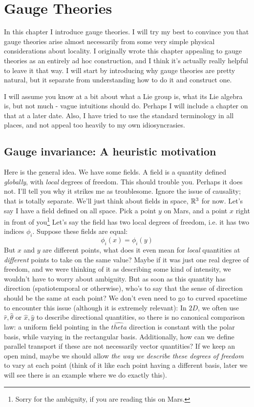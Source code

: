\documentclass[main.tex]{subfiles}
\begin{document}
\chapter{Gauge Theories}
In this chapter I introduce gauge theories. I will try my best to convince you that gauge theories arise almost necessarily from some very simple physical considerations about locality. I originally wrote this chapter appealing to gauge theories as an entirely ad hoc construction, and I think it's actually really helpful to leave it that way. I will start by introducing why gauge theories are pretty natural, but it separate from understanding how to do it and construct one.

I will assume you know at a bit about what a Lie group is, what its Lie algebra is, but not much - vague intuitions should do. Perhaps I will include a chapter on that at a later date. Also, I have tried to use the standard terminology in all places, and not appeal too heavily to my own idiosyncrasies.


\section{Gauge invariance: A heuristic motivation}

Here is the general idea. We have some fields. A field is a quantity defined \textit{globally}, with \textit{local} degrees of freedom. This should trouble you. Perhaps it does not. I'll tell you why it strikes me as troublesome. Ignore the issue of causality; that is totally separate. We'll just think about fields in space, $\mathbb{R}^3$ for now. Let's say I have a field defined on all space. Pick a point $y$ on Mars, and a point $x$ right in front of you\footnote{Sorry for the ambiguity, if you are reading this on Mars.} Let's say the field has two local degrees of freedom, i.e. it has two indices $\phi_i$. Suppose these fields are equal:
\[
\phi_i (x) = \phi_i (y)
\]
But $x$ and $y$ are different points, what does it even mean for \textit{local} quantities at \textit{different} points to take on the same value? Maybe if it was just one real degree of freedom, and we were thinking of it as describing some kind of intensity, we wouldn't have to worry about ambiguity. But as soon as this quantity has direction (spatiotemporal or otherwise), who's to say that the sense of direction should be the same at each point? We don't even need to go to curved spacetime to encounter this issue (although it is extremely relevant): In $2D$, we often use $\hat{r},\hat{\theta}$ or $\hat{x},\hat{y}$ to describe directional quantities, so there is no canonical comparison law: a uniform field pointing in the $\hat{theta}$ direction is constant with the polar basis, while varying in the rectangular basis. Additionally, how can we define parallel transport if these are not necessarily vector quantities? If we keep an open mind, maybe we should allow \textit{the way we describe these degrees of freedom} to vary at each point (think of it like each point having a different basis, later we will see there is an example where we do exactly this). 
\end{document}
